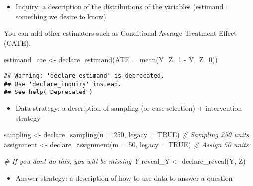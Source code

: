 \documentclass[
]{book}
\newenvironment{Shaded}{\begin{snugshade}}{\end{snugshade}}
\newcommand{\AttributeTok}[1]{\textcolor[rgb]{0.77,0.63,0.00}{#1}}
\newcommand{\CommentTok}[1]{\textcolor[rgb]{0.56,0.35,0.01}{\textit{#1}}}
\newcommand{\ConstantTok}[1]{\textcolor[rgb]{0.00,0.00,0.00}{#1}}
\newcommand{\DecValTok}[1]{\textcolor[rgb]{0.00,0.00,0.81}{#1}}
\newcommand{\FunctionTok}[1]{\textcolor[rgb]{0.00,0.00,0.00}{#1}}
\newcommand{\NormalTok}[1]{#1}
\newcommand{\OtherTok}[1]{\textcolor[rgb]{0.56,0.35,0.01}{#1}}
\newcommand{\SpecialCharTok}[1]{\textcolor[rgb]{0.00,0.00,0.00}{#1}}
\providecommand{\tightlist}{%
  \setlength{\itemsep}{0pt}\setlength{\parskip}{0pt}}
\begin{document}
\begin{itemize}
\tightlist
\item
  Inquiry: a description of the distributions of the variables (estimand = something we desire to know)
\end{itemize}

You can add other estimators such as Conditional Average Treatment Effect (CATE).

\begin{Shaded}
\begin{Highlighting}[]
\NormalTok{estimand\_ate }\OtherTok{\textless{}{-}} \FunctionTok{declare\_estimand}\NormalTok{(}\AttributeTok{ATE =} \FunctionTok{mean}\NormalTok{(Y\_Z\_1 }\SpecialCharTok{{-}}\NormalTok{ Y\_Z\_0))}
\end{Highlighting}
\end{Shaded}

\begin{verbatim}
## Warning: 'declare_estimand' is deprecated.
## Use 'declare_inquiry' instead.
## See help("Deprecated")
\end{verbatim}

\begin{itemize}
\tightlist
\item
  Data strategy: a description of sampling (or case selection) + intervention strategy
\end{itemize}

\begin{Shaded}
\begin{Highlighting}[]
\NormalTok{sampling }\OtherTok{\textless{}{-}} \FunctionTok{declare\_sampling}\NormalTok{(}\AttributeTok{n =} \DecValTok{250}\NormalTok{, }\AttributeTok{legacy =} \ConstantTok{TRUE}\NormalTok{) }\CommentTok{\# Sampling 250 units }
\NormalTok{assignment }\OtherTok{\textless{}{-}} \FunctionTok{declare\_assignment}\NormalTok{(}\AttributeTok{m =} \DecValTok{50}\NormalTok{, }\AttributeTok{legacy =} \ConstantTok{TRUE}\NormalTok{) }\CommentTok{\# Assign 50 units }

\CommentTok{\# If you don\textquotesingle{}t do this, you will be missing Y }
\NormalTok{reveal\_Y }\OtherTok{\textless{}{-}} \FunctionTok{declare\_reveal}\NormalTok{(Y, Z)}
\end{Highlighting}
\end{Shaded}

\begin{itemize}
\tightlist
\item
  Answer strategy: a description of how to use data to answer a question
\end{itemize}
\end{document}
